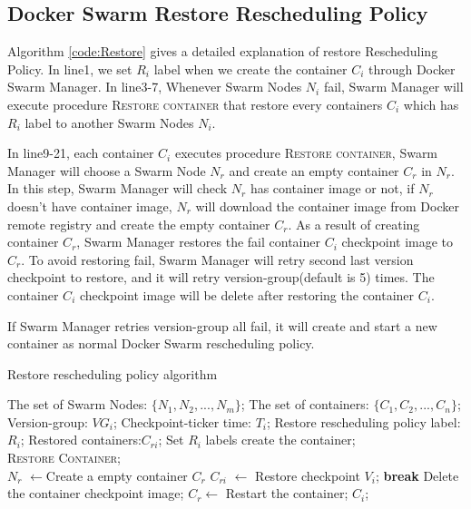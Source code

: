 \subsection{Docker Swarm Restore Rescheduling Policy}
Algorithm \ref{code:Restore} gives a detailed explanation of restore Rescheduling Policy. In line1, we set $ R_i $ label when we create the container $C_i$ through Docker Swarm Manager. In line3-7, Whenever Swarm Nodes $ N_i $ fail, Swarm Manager will execute procedure \textsc{Restore container} that restore every containers $ C_i $ which has $ R_i $ label to another Swarm Nodes $ N_i $.

In line9-21, each container $ C_i $ executes procedure \textsc{Restore container}, Swarm Manager will choose a Swarm Node $ N_r $ and create an empty container $ C_r $ in $ N_r $. In this step, Swarm Manager will check $ N_r $ has container image or not, if $ N_r $ doesn't have container image, $ N_r $ will download the container image from Docker remote registry and create the empty container $ C_r $.
As a result of creating container $ C_r $, Swarm Manager restores the fail container $ C_i $ checkpoint image to $ C_r $. To avoid restoring fail, Swarm Manager will retry second last version checkpoint to restore, and it will retry version-group(default is 5) times. The container $ C_i $ checkpoint image will be delete after restoring the container  $ C_i $.

If Swarm Manager retries version-group all fail, it will create and start a new container as normal Docker Swarm rescheduling policy.

\begin{algorithm}[h]
    \caption{Restore rescheduling policy algorithm}
    \label{code:Restore}
    \begin{algorithmic}[1]
    	\Require
		The set of Swarm Nodes: $ \lbrace N_1,N_2,...,N_m \rbrace $;
		The set of containers: $ \lbrace C_1,C_2,...,C_n \rbrace $;
		Version-group: $ VG_i $;
		Checkpoint-ticker time: $ T_i $;
		Restore rescheduling policy label:$ R_i $;
	\Ensure
		Restored containers:$ C_{ri} $;
        \State Set $ R_i $ labels create the container;
        \\
        		\State \textsc{Restore Container};
        	\EndFor
        \EndIf
        \\
			\State $ N_r $ $\longleftarrow$Create a empty container $ C_r $
				\State $ C_{ri} $ $\longleftarrow$ Restore checkpoint $ V_i $;
					\State \textbf{break}
				\EndIf
			\EndFor
			\State Delete the container checkpoint image;
				\State $ C_r \longleftarrow $ Restart the container; $C_i$;
			\EndIf
		\EndProcedure
	\end{algorithmic}
\end{algorithm}
